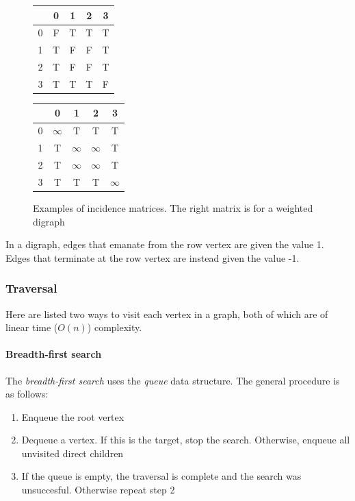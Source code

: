 \documentclass{article}
\begin{document}
\begin{figure}[H]
  \centering
  \begin{tabular}{|c|c|c|c|c|}
    \hline
    \  & 0 & 1 & 2 & 3 \\ [0.5ex]
    \hline
    0  & F & T & T & T \\ 
    \hline
    1  & T & F & F & T \\
    \hline
    2  & T & F & F & T \\
    \hline
    3  & T & T & T & F \\
    \hline
  \end{tabular}
  \quad
  \begin{tabular}{|c|c|c|c|c|}
    \hline
    \  & 0 & 1 & 2 & 3 \\ [0.5ex]
    \hline
    0  & \(\infty\) & T & T & T \\
    \hline
    1  & T & \(\infty\) & \(\infty\) & T \\
    \hline
    2  & T & \(\infty\) & \(\infty\) & T \\
    \hline
    3  & T & T & T & \(\infty\) \\
    \hline
  \end{tabular}
  \caption{Examples of incidence matrices. The right matrix is for a weighted digraph}
\end{figure}

In a digraph, edges that emanate from the row vertex are given the value 1. Edges that terminate at the row vertex
are instead given the value -1.

\subsubsection{Traversal}
Here are listed two ways to visit each vertex in a graph,
both of which are of linear time (\(O(n)\)) complexity.

\paragraph{Breadth-first search}
The {\em breadth-first search} uses the {\em queue} data structure. The general procedure is as follows:
\begin{enumerate}
\item{Enqueue the root vertex}
\item{Dequeue a vertex. If this is the target, stop the search. Otherwise, enqueue all unvisited direct children}
\item{If the queue is empty, the traversal is complete and the search was unsuccesful. Otherwise repeat step 2}
\end{enumerate}
\end{document}
